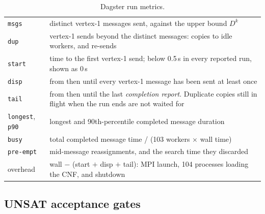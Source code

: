 \documentclass[11pt,a4paper,oneside]{report}
\theoremstyle{definition}
\newcommand{\code}[1]{\texttt{#1}}
\begin{document}
\begin{table}[H]
\centering
\small
\begin{tabular}{@{}l p{12cm}@{}}
\toprule
\code{msgs} & distinct vertex-1 messages sent, against the upper bound $D^k$ \\
\code{dup} & vertex-1 sends beyond the distinct messages: copies to idle workers, and re-sends \\
\code{start} & time to the first vertex-1 send; below 0.5\,s in every reported run, shown as 0\,s \\
\code{disp} & from then until every vertex-1 message has been sent at least once \\
\code{tail} & from then until the last \emph{completion report}. Duplicate copies still in
flight when the run ends are not waited for \\
\code{longest}, \code{p90} & longest and 90th-percentile completed message duration \\
\code{busy} & total completed message time / (103 workers $\times$ wall time) \\
\code{pre-empt} & mid-message reassignments, and the search time they discarded \\
overhead & wall $-$ (start $+$ disp $+$ tail): MPI launch, 104 processes loading the CNF,
and shutdown \\
\bottomrule
\end{tabular}
\caption{Dagster run metrics.}
\label{p8-tab:metrics}
\end{table}

\subsection{UNSAT acceptance gates}\label{p8-sec:gates}
\end{document}
